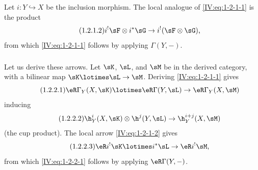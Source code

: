 Let $i:Y\hookrightarrow X$ be the inclusion morphism. The local analogue of
\eqref{IV:eq:1-2-1-1} is the product
\begin{equation*}\tag{1.2.1.2}\label{IV:eq:1-2-1-2}
  i^!\sF\otimes i^*\sG \to i^!(\sF\otimes\sG) \text{,}
\end{equation*}
from which \eqref{IV:eq:1-2-1-1} follows by applying $\Gamma(Y,-)$.






\subsubsection{}\label{IV:1-2-2}

Let us derive these arrows. Let $\sK$, $\sL$, and $\sM$ be in the derived
category, with a bilinear map $\sK\lotimes\sL\to\sM$. Deriving
\eqref{IV:eq:1-2-1-1} gives
\begin{equation*}\tag{1.2.2.1}\label{IV:eq:1-2-2-1}
  \eR\Gamma_Y(X,\sK) \lotimes \eR\Gamma(Y,\sL) \to \eR\Gamma_Y(X,\sM)
\end{equation*}
inducing
\begin{equation*}\tag{1.2.2.2}\label{IV:eq:1-2-2-2}
  \h_Y^i(X,\sK)\otimes \h^j(Y,\sL) \to \h_Y^{i+j}(X,\sM)
\end{equation*}
(the cup product). The local arrow \eqref{IV:eq:1-2-1-2} gives
\begin{equation*}\tag{1.2.2.3}\label{IV:eq:1-2-2-3}
  \eR i^! \sK\lotimes i^*\sL \to \eR i^!\sM \text{,}
\end{equation*}
from which \eqref{IV:eq:1-2-2-1} follows by applying $\eR\Gamma(Y,-)$.





\subsubsection{}\label{IV:1-2-3}

